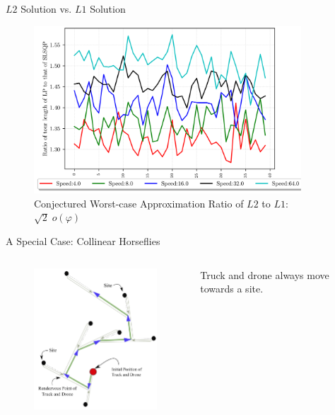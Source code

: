 \documentclass{beamer}
\begin{document}

\begin{frame}{$L2$ Solution vs. $L1$ Solution}
  \begin{figure}
        \includegraphics[width=10.0cm]{../img/tour_length_ratios.png}
        \caption*{Conjectured Worst-case Approximation Ratio of $L2$ to $L1$: {$\sqrt{2} \; o(\varphi) $}}
  \end{figure}
\end{frame}


\begin{frame}{A Special Case: Collinear Horseflies}

  \begin{columns}
     \begin{column}{0.6\textwidth}

       \begin{figure}[H]
         \centering
         \includegraphics[width=6.0cm]{slide_imgs/collinear_horseflies.png}
       \end{figure}
       
     \end{column}
          
     \begin{column}{0.4\textwidth}
       \begin{center}
          \begin{framed}
             Truck and drone always move towards a site. 
           \end{framed}
        \end{center}
     \end{column}
  \end{columns}


  

\end{frame}
\end{document}
